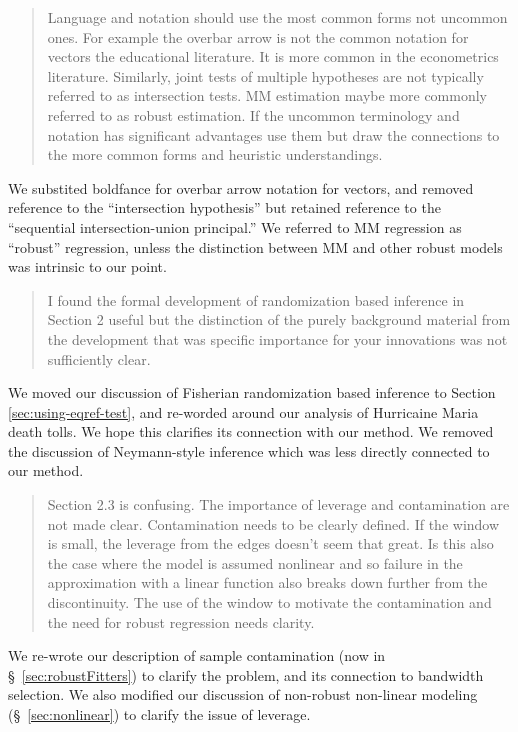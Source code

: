 \documentclass[12pt]{article}
\begin{document}
\begin{itemize}
\begin{quote}
Language and notation should use the most common forms not
uncommon ones. For example the overbar arrow is not the common
notation for vectors the educational literature. It is more common in
the econometrics literature. Similarly, joint tests of multiple
hypotheses are not typically referred to as intersection tests. MM
estimation maybe more commonly referred to as robust estimation. If
the uncommon terminology and notation has significant advantages use
them but draw the connections to the more common forms and heuristic
understandings.
\end{quote}
We substited boldfance for overbar arrow notation for vectors, and removed reference to
the ``intersection hypothesis'' but retained reference to the
``sequential intersection-union principal.'' We referred to MM
regression as ``robust'' regression, unless the distinction between MM
and other robust models was intrinsic to our point.

\begin{quote}
I found the formal development of randomization based inference in
Section 2 useful but the distinction of the purely background material
from the development that was specific importance for your innovations
was not sufficiently clear.
\end{quote}
We moved our discussion of Fisherian randomization based inference to
Section \ref{sec:using-eqref-test}, and re-worded around our
analysis of Hurricaine Maria death tolls. We hope this clarifies its
connection with our method. We removed the discussion of Neymann-style
inference which was less directly connected to our method.

\begin{quote}
Section 2.3 is confusing. The importance of leverage and contamination
are not made clear. Contamination needs to be clearly defined. If the
window is small, the leverage from the edges doesn’t seem that
great. Is this also the case where the model is assumed nonlinear and
so failure in the approximation with a linear function also breaks
down further from the discontinuity. The use of the window to motivate
the contamination and the need for robust regression needs clarity.
\end{quote}
We re-wrote our description of sample contamination (now in
\S~\ref{sec:robustFitters}) to clarify the problem, and its connection
to bandwidth selection.
We also modified our discussion of non-robust non-linear modeling
(\S~\ref{sec:nonlinear}) to clarify the issue of leverage.


\end{itemize}
\end{document}
